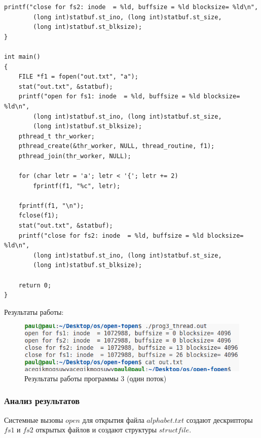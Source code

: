 \begin{center}
	\captionsetup{justification=raggedright,singlelinecheck=off}

	\begin{lstlisting}[label=lst:prog3-th-2,caption=Программа 3 --- два потока --- часть 2]
    printf("close for fs2: inode  = %ld, buffsize = %ld blocksize= %ld\n",
        (long int)statbuf.st_ino, (long int)statbuf.st_size,
        (long int)statbuf.st_blksize);
}

int main() 
{
    FILE *f1 = fopen("out.txt", "a");
    stat("out.txt", &statbuf);
    printf("open for fs1: inode  = %ld, buffsize = %ld blocksize= %ld\n",
        (long int)statbuf.st_ino, (long int)statbuf.st_size,
        (long int)statbuf.st_blksize);
    pthread_t thr_worker;
    pthread_create(&thr_worker, NULL, thread_routine, f1);
    pthread_join(thr_worker, NULL);

    for (char letr = 'a'; letr < '{'; letr += 2) 
        fprintf(f1, "%c", letr);

    fprintf(f1, "\n");
    fclose(f1);
    stat("out.txt", &statbuf);
    printf("close for fs2: inode  = %ld, buffsize = %ld blocksize= %ld\n",
        (long int)statbuf.st_ino, (long int)statbuf.st_size,
        (long int)statbuf.st_blksize);

    return 0;
}
	\end{lstlisting}
\end{center}

\clearpage

Результаты работы:

\begin{figure}[h]
	\centering
	\captionsetup{justification=centering}
	\includegraphics[width=150mm]{img/prog3_thread.png}
	\caption{Результаты работы программы 3 (один поток)}
	\label{fig:prog-3-th-result}
\end{figure}

\subsubsection*{Анализ результатов}

Системные вызовы $open$ для открытия файла $alphabet.txt$ создают дескрипторы $fs1$ и $fs2$  открытых файлов и создают структуры $struct file$.

